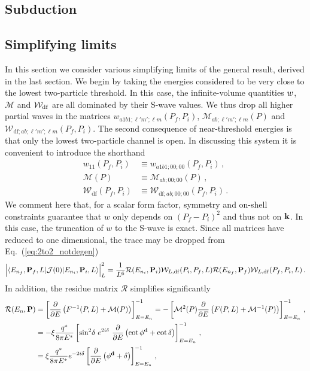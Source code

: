  \subsection{Subduction}
 
\subsection{Simplifying limits}

\label{sec:simplim}

In this section we consider various simplifying limits of the general result, derived in the last section. We begin by taking the energies considered to be very close to the lowest two-particle threshold.   In this case, the infinite-volume quantities $w$, $\mathcal M$ and ${\mathcal{W}}_{\rm df}$ are all dominated by their S-wave values. We thus drop all higher partial waves in the matrices $w_{a1b1; \ell' m'; \ell  m }(P_f,P_i)$, $\mathcal M_{ab; \ell' m'; \ell m}(P)$ and $\mathcal W_{\mathrm{df};ab;\ell' m'; \ell m}(P_f,P_i)$. The second consequence of near-threshold energies is that only the lowest two-particle channel is open. In discussing this system it is convenient to introduce the shorthand
\begin{align}
w_{11}(P_f,P_i) & \equiv w_{a1b1; 00;00 }(P_f,P_i) \,, \\
\mathcal M (P) & \equiv \mathcal M_{ab; 00; 00}(P)\,, \\
\mathcal W_{\mathrm{df}}(P_f,P_i) & \equiv \mathcal W_{\mathrm{df};ab;00;00}(P_f,P_i) \,.
\end{align}
We comment here that, for a scalar form factor, symmetry and on-shell constraints guarantee that $w$ only depends on $(P_f-P_i)^2$ and thus not on $\textbf k$. In this case, the truncation of $w$ to the S-wave is exact.  
 Since all matrices have reduced to one dimensional, the trace may be dropped from Eq.~(\ref{eq:2to2_notdegen})
\begin{equation}
\label{eq:mainresSwave}
\Big | \langle E_{n_f}, \textbf P_f, L \vert  \mathcal J(0)  \vert E_{n_i}, \textbf P_i, L \rangle \Big |^2_L 
=\frac{1}{L^6}
 \mathcal R(E_{n_i}, \textbf P_i)
{\mathcal{W}}_{L,{\rm df}}(P_i,P_f,L) \mathcal R(E_{n_f}, \textbf P_f) 
 {\mathcal{W}}_{L,{\rm df}}(P_f,P_i,L) \,.
\end{equation}
 In addition, the residue matrix $\mathcal R$ simplifies significantly
\begin{align}
\mathcal R(E_{n}, \textbf P) & =   \left [ \frac{\partial}{\partial E} \left( F^{-1}(P,L) + \mathcal M(P) \right ) \right ]_{E=E_n}^{-1} = -  \left [ \mathcal M^2(P) \frac{\partial}{\partial E} \left( F(P,L) + \mathcal M^{-1}(P) \right ) \right ]_{E=E_n}^{-1} \,, \\
& = - \xi \frac{q^*}{8 \pi E^*}   \left [ \sin^2\! \delta\ e^{ 2i \delta}\  \frac{\partial}{\partial E} \left( \cot\phi^\textbf{d}_{}+ \cot\delta \right ) \right ]_{E=E_n}^{-1}    \,, \\
& = \xi \frac{q^*}{8 \pi E^*} e^{-2i \delta}  \left [  \frac{\partial}{\partial E} \left( \phi^\textbf{d}_{} + \delta \right ) \right ]_{E=E_n}^{-1}    \,,
 \end{align}
